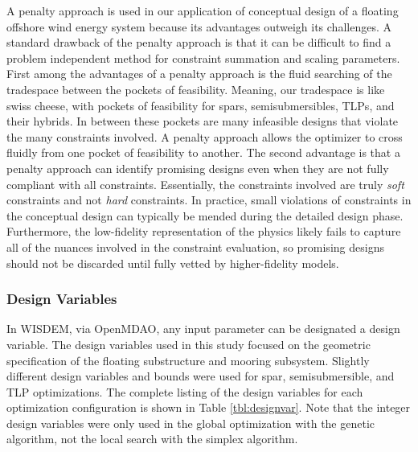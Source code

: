 A penalty approach is used in our application of conceptual design of a
floating offshore wind energy system because its advantages outweigh its
challenges.  A standard drawback of the penalty approach is that it can
be difficult to find a problem independent method for constraint
summation and scaling parameters.  First among the advantages of a
penalty approach is the fluid searching of the tradespace between the
pockets of feasibility.  Meaning, our tradespace is like swiss cheese,
with pockets of feasibility for spars, semisubmersibles, TLPs, and their
hybrids.  In between these pockets are many infeasible designs that
violate the many constraints involved.  A penalty approach allows the
optimizer to cross fluidly from one pocket of feasibility to another.
The second advantage is that a penalty approach can identify promising
designs even when they are not fully compliant with all constraints.
Essentially, the constraints involved are truly \textit{soft}
constraints and not \textit{hard} constraints.  In practice, small
violations of constraints in the conceptual design can typically be
mended during the detailed design phase.  Furthermore, the low-fidelity
representation of the physics likely fails to capture all of the nuances
involved in the constraint evaluation, so promising designs should not
be discarded until fully vetted by higher-fidelity models.

\subsubsection{Design Variables}
In WISDEM, via OpenMDAO, any input parameter can be designated a design
variable.  The design variables used in this study focused on the
geometric specification of the floating substructure and mooring
subsystem.  Slightly different design variables and bounds were used for
spar, semisubmersible, and TLP optimizations.  The complete listing of
the design variables for each optimization configuration is shown in
Table \ref{tbl:designvar}.  Note that the integer design variables were
only used in the global optimization with the genetic algorithm, not the
local search with the simplex algorithm.

